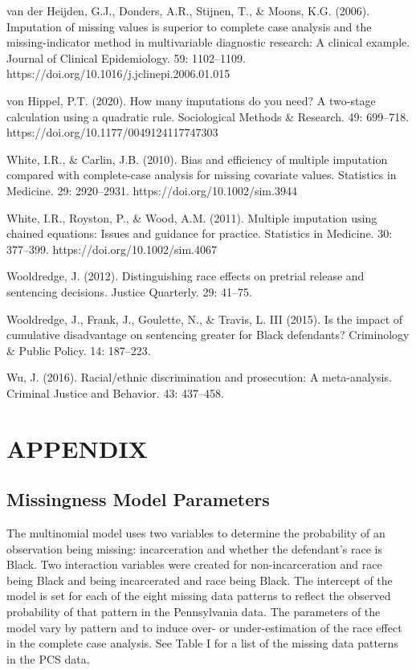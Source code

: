 \documentclass[titlepage]{article}
\begin{document}
van der Heijden, G.J., Donders, A.R., Stijnen, T., \& Moons, K.G. (2006). Imputation of missing values is superior to complete case analysis and the missing-indicator method in multivariable diagnostic research: A clinical example. Journal of Clinical Epidemiology. 59: 1102--1109. https://doi.org/10.1016/j.jclinepi.2006.01.015

von Hippel, P.T. (2020). How many imputations do you need? A two-stage calculation using a quadratic rule. Sociological Methods \& Research. 49: 699–718. https://doi.org/10.1177/0049124117747303 

White, I.R., \& Carlin, J.B. (2010). Bias and efficiency of multiple imputation compared with complete-case analysis for missing covariate values. Statistics in Medicine. 29: 2920--2931. https://doi.org/10.1002/sim.3944

White, I.R., Royston, P., \& Wood, A.M. (2011). Multiple imputation using chained equations: Issues and guidance for practice. Statistics in Medicine. 30: 377–399. https://doi.org/10.1002/sim.4067 

Wooldredge, J. (2012). Distinguishing race effects on pretrial release and sentencing decisions. Justice Quarterly. 29: 41--75.

Wooldredge, J., Frank, J., Goulette, N., \& Travis, L. III (2015). Is the impact of cumulative disadvantage on sentencing greater for Black defendants? Criminology \& Public Policy. 14: 187--223.

Wu, J. (2016). Racial/ethnic discrimination and prosecution: A meta-analysis. Criminal Justice and Behavior. 43: 437--458.

\newpage
\section{APPENDIX}

\subsection{Missingness Model Parameters}

The multinomial model uses two variables to determine the probability of an observation being missing: incarceration and whether the defendant’s race is Black. Two interaction variables were created for non-incarceration and race being Black and being incarcerated and race being Black. The intercept of the model is set for each of the eight missing data patterns to reflect the observed probability of that pattern in the Pennsylvania data. The parameters of the model vary by pattern and to induce over- or under-estimation of the race effect in the complete case analysis. See Table I for a list of the missing data patterns in the PCS data.
\end{document}
